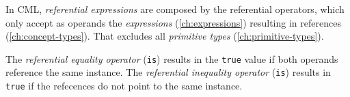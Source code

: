 In CML, \emph{referential expressions} are composed by the referential operators,
which only accept as operands the \emph{expressions} (\ref{ch:expressions})
resulting in references (\ref{ch:concept-types}).
That excludes all \emph{primitive types} (\ref{ch:primitive-types}).

The \emph{referential equality operator} (\verb|is|)
results in the \verb|true| value
if both operands reference the same instance.
The \emph{referential inequality operator} (\verb|is|)
results in \verb|true| if the refecences do not point to the same instance.
